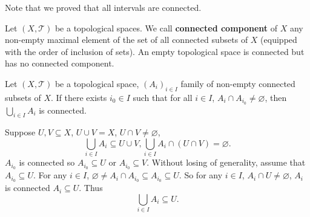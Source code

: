 \begin{remark}
    Note that we proved that all intervals are connected.
\end{remark}

\begin{definitionenv}
    Let $(X,\mathscr{T})$ be a topological spaces.
    We call \textbf{connected component} of $X$ any non-empty maximal element of the set of all connected subsets of $X$ (equipped with the order of inclusion of sets).
    An empty topological space is connected but has no connected component.
\end{definitionenv}

\begin{lemmaenv}\label{thm:IsConnected.biUnion_of_reflTransGen}
    Let $(X,\mathscr{T})$ be a topological space, $\left(A_i\right)_{i\in I}$ family of non-empty connected subsets of $X$.
    If there exists $i_0 \in I$ such that for all $i \in I$, $A_{i} \cap A_{i_0} \neq \varnothing$, then $\bigcup_{i\in I}A_i$ is connected.
\end{lemmaenv}
\begin{proofenv}
    Suppose $U,V \subseteq X$, $U \cup V = X$, $U \cap V \neq \varnothing$,
    $$ \bigcup_{i\in I} A_i \subseteq U \cup V, \bigcup_{i\in I}A_i \cap \left(U \cap V\right) = \varnothing.$$
    $A_{i_0}$ is connected so $A_{i_0} \subseteq U$ or $A_{i_0} \subseteq V$.
    Without losing of generality, assume that $A_{i_0} \subseteq U$.
    For any $i \in I$, $\varnothing \neq A_i\cap A_{i_0} \subseteq A_{i_0} \subseteq U$.
    So for any $i \in I$, $A_i\cap U \neq \varnothing$, $A_i$ is connected $A_i \subseteq U$.
    Thus 
    $$ \bigcup_{i\in I}A_i \subseteq U.$$
\end{proofenv}

